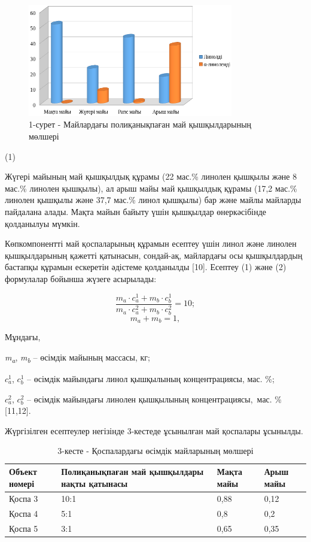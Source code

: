 \begin{figure}[H]
	\centering
	\includegraphics[width=0.8\textwidth]{assets/1107}
    \caption*{1-сурет - Майлардағы полиқанықпаған май қышқылдарының мөлшері}
\end{figure} (1)

Жүгері майының май қышқылдық құрамы (22 мас.\% линолен қышқылы және 8
мас.\% линолен қышқылы), ал арыш майы май қышқылдық құрамы (17,2 мас.\%
линолен қышқылы және 37,7 мас.\% линол қышқылы) бар және майлы майларды
пайдалана алады. Мақта майын байыту үшін қышқылдар өнеркәсібінде
қолданылуы мүмкін.

Көпкомпонентті май қоспаларының құрамын есептеу үшін линол және линолен
қышқылдарының қажетті қатынасын, сондай-ақ, майлардағы осы қышқылдардың
бастапқы құрамын ескеретін әдістеме қолданылды {[}10{]}. Есептеу (1)
және (2) формулалар бойынша жүзеге асырылады:

\begin{equation}
\frac{m_{a}\cdot c^{1}_{a}+m_{b}\cdot c^{1}_{b}}{m_{a}\cdot c^{2}_{a}+m_{b}\cdot c^{2}_{b}}=10;
\end{equation}
\begin{equation}
  m_{a}+m_{b}=1,
\end{equation}

Мұндағы,

\emph{m\textsubscript{a}}, \emph{m\textsubscript{b}} -- өсімдік майының
массасы, кг;

$c^{1}_{a}$, $c^{1}_{b}$ -- өсімдік майындағы линол қышқылының концентрациясы, мас. \%;

$c^{2}_{a}$, $c^{2}_{b}$ -- өсімдік майындағы линолен қышқылының концентрациясы,~мас. \%
{[}11,12{]}.

Жүргізілген есептеулер негізінде 3-кестеде ұсынылған май қоспалары
ұсынылды.

\begin{table}[H]
\caption*{3-кесте - Қоспалардағы өсімдік майларының мөлшері}
\centering
\begin{tabular}{|l|l|l|l|}
\hline
Объект номері & Полиқанықпаған май қышқылдары нақты қатынасы & Мақта майы & Арыш майы \\ \hline
Қоспа 3 & 10:1 & 0,88 & 0,12 \\ \hline
Қоспа 4 & 5:1 & 0,8 & 0,2 \\ \hline
Қоспа 5 & 3:1 & 0,65 & 0,35 \\ \hline
\end{tabular}%
\end{table}

